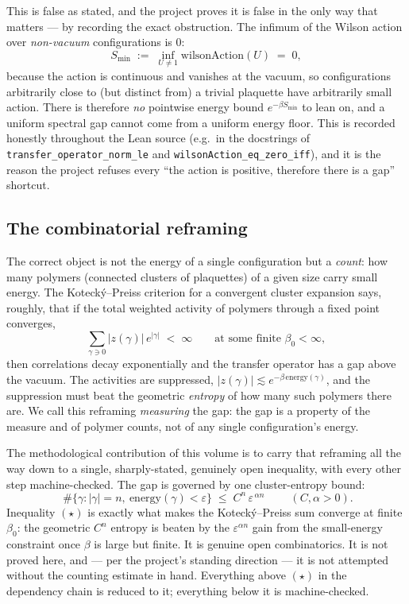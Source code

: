 \documentclass[11pt]{article}
\newcommand{\code}[1]{\texttt{#1}}
\begin{document}
This is false as stated, and the project proves it is false in the
only way that matters --- by recording the exact obstruction. The
infimum of the Wilson action over \emph{non-vacuum} configurations is
$0$:
\[
  S_{\min} \;:=\; \inf_{U\neq 1} \mathrm{wilsonAction}(U) \;=\; 0,
\]
because the action is continuous and vanishes at the vacuum, so
configurations arbitrarily close to (but distinct from) a trivial
plaquette have arbitrarily small action. There is therefore
\emph{no} pointwise energy bound $e^{-\beta S_{\min}}$ to lean on,
and a uniform spectral gap cannot come from a uniform energy floor.
This is recorded honestly throughout the Lean source (e.g.\ in the
docstrings of \code{transfer\_operator\_norm\_le} and
\code{wilsonAction\_eq\_zero\_iff}), and it is the reason the project
refuses every ``the action is positive, therefore there is a gap''
shortcut.

\subsection{The combinatorial reframing}

The correct object is not the energy of a single configuration but a
\emph{count}: how many polymers (connected clusters of plaquettes)
of a given size carry small energy. The Koteck\'y--Preiss criterion
for a convergent cluster expansion says, roughly, that if the total
weighted activity of polymers through a fixed point converges,
\[
  \sum_{\gamma\ni 0} \lvert z(\gamma)\rvert\, e^{\lvert\gamma\rvert}
  \;<\;\infty
  \qquad\text{at some finite }\beta_0<\infty,
\]
then correlations decay exponentially and the transfer operator has a
gap above the vacuum. The activities are suppressed,
$\lvert z(\gamma)\rvert \lesssim e^{-\beta\,\mathrm{energy}(\gamma)}$,
and the suppression must beat the geometric \emph{entropy} of how
many such polymers there are. We call this reframing
\emph{measuring} the gap: the gap is a property of the measure and
of polymer counts, not of any single configuration's energy.

The methodological contribution of this volume is to carry that
reframing all the way down to a single, sharply-stated, genuinely
open inequality, with every other step machine-checked. The gap is
governed by one cluster-entropy bound:
\[
  \boxed{\;\#\{\gamma : \lvert\gamma\rvert = n,\ \mathrm{energy}(\gamma) < \varepsilon\}
  \;\le\; C^n\,\varepsilon^{\,\alpha n}\;}
  \qquad (C,\alpha>0).
\tag{$\star$}
\]
Inequality $(\star)$ is exactly what makes the Koteck\'y--Preiss sum
converge at finite $\beta_0$: the geometric $C^n$ entropy is beaten by
the $\varepsilon^{\alpha n}$ gain from the small-energy constraint
once $\beta$ is large but finite. It is genuine open combinatorics. It
is not proved here, and --- per the project's standing direction --- it
is not attempted without the counting estimate in hand. Everything
above $(\star)$ in the dependency chain is reduced to it; everything
below it is machine-checked.
\end{document}
